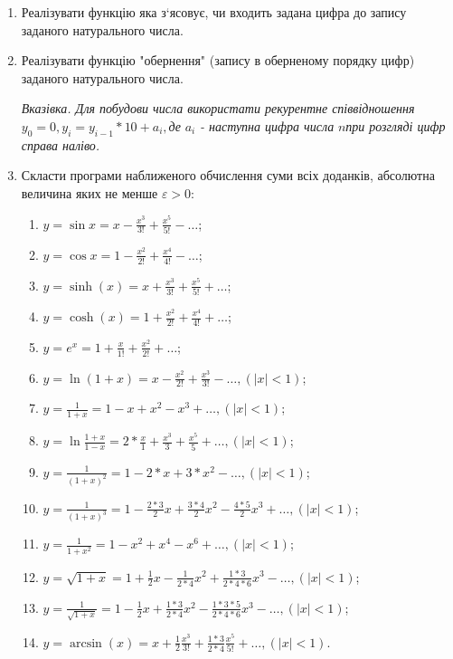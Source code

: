 \documentclass[]{article}
\makeatletter
\newcommand{\xslalph}[1]{\expandafter\@xslalph\csname c@#1\endcsname}
\newcommand{\@xslalph}[1]{%
    \ifcase#1\or а\or б\or в\or г\or д\or e\or є\or ж\or з\or i%
    \or й\or к\or л\or м\or н\or о\or п\or р\or с\or т%
    \or у\or ф\or х\or ц\or ч\or ш\or ю\or я\or аа\or бб\or вв%
    \else\@ctrerr\fi%
}
\makeatother
\begin{document}
\begin{enumerate}
\begin{enumerate}[label=\xslalph*)]
\end{enumerate}

\item
  Реалізувати функцію яка з`ясовує, чи входить задана цифра до запису
  заданого натурального числа.
\item
  Реалізувати функцію "обернення" (запису в оберненому порядку цифр)
  заданого натурального числа.

\emph{\emph{Вказівка. Для побудови числа використати рекурентне
співвідношення}} \(y_{0} = 0,y_{i} = y_{i - 1}*10 + a_{i},\)\emph{де}
\(a_{i}\) \emph{- наступна цифра числа} \(n\)\emph{при розгляді цифр
справа наліво.}

\item
  Скласти програми наближеного обчислення суми всіх доданків, абсолютна
  величина яких не менше $\varepsilon > 0 $:
\begin{enumerate}[label=\xslalph*)]
\item \(y = \sin x = x - \frac{x^{3}}{3!} + \frac{x^{5}}{5!} - \ldots\);
\item \(y = \cos x = 1 - \frac{x^{2}}{2!} + \frac{x^{4}}{4!} - \ldots\);
\item
\(y = \sinh (x) = x + \frac{x^{3}}{3!} + \frac{x^{5}}{5!} + \ldots\);
\item 
\(y = \cosh (x) = 1 + \frac{x^{2}}{2!} + \frac{x^{4}}{4!} + \ldots\);
\item \(y = e^{x} = 1 + \frac{x}{1!} + \frac{x^{2}}{2!} + \ldots\);
\item
\(y = \ln(1 + x) = x - \frac{x^{2}}{2!} + \frac{x^{3}}{3!} - \ldots,(\left| x \right| < 1)\);
\item
\(y = \frac{1}{1 + x} = 1 - x + x^{2} - x^{3} + \ldots,(\left| x \right| < 1)\);
\item
\(y = \ln\frac{1 + x}{1 - x} = 2*\frac{x}{1} + \frac{x^{3}}{3} + \frac{x^{5}}{5} + \ldots, (\left| x \right| < 1)\);
\item
\(y = \frac{1}{(1 + x)^{2}} = 1 - 2*x + 3*x^{2} - \ldots,(\left| x \right| < 1)\);
\item
\(y = \frac{1}{(1 + x)^{3}} = 1 - \frac{2*3}{2}x + \frac{3*4}{2}x^{2} - \frac{4*5}{2}x^{3} + \ldots,(\left| x \right| < 1)\);
\item
\(y = \frac{1}{1 + x^{2}} = 1 - x^{2} + x^{4} - x^{6} + \ldots,(\left| x \right| < 1)\);
\item
\(y = \sqrt{1 + x} = 1 + \frac{1}{2}x - \frac{1}{2*4}x^{2} + \frac{1*3}{2*4*6}x^{3} - \ldots,(\left| x \right| < 1)\);
\item
\(y = \frac{1}{\sqrt{1 + x}} = 1 - \frac{1}{2}x + \frac{1*3}{2*4}x^{2} - \frac{1*3*5}{2*4*6}x^{3} - \ldots,(\left| x \right| < 1)\);
\item
\(y = \arcsin (x) = x + \frac{1}{2}\frac{x^{3}}{3!} + \frac{1*3}{2*4}\frac{x^{5}}{5!} + \ldots,(\left| x \right| < 1)\).


\end{enumerate}
\end{enumerate}
\end{document}
